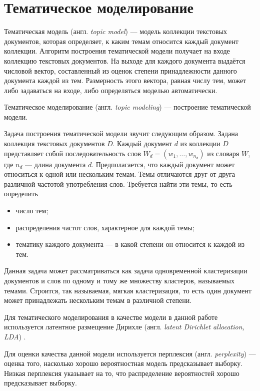 \section{Тематическое моделирование}

Тематическая модель (англ. \textit{topic model}) — модель коллекции текстовых документов, которая определяет, к каким темам относится каждый документ коллекции. Алгоритм построения тематической модели получает на входе коллекцию текстовых документов. На выходе для каждого документа выдаётся числовой вектор, составленный из оценок степени принадлежности данного документа каждой из тем. Размерность этого вектора, равная числу тем, может либо задаваться на входе, либо определяться моделью автоматически.

Тематическое моделирование (англ. \textit{topic modeling}) — построение тематической модели.

Задача построения тематической модели звучит следующим образом. Задана коллекция текстовых документов $D$. Каждый документ $d$ из коллекции $D$ представляет собой последовательность слов $W_d=(w_1,\ldots,w_{n_d})$ из словаря $W$, где $n_d$ — длина документа $d$. Предполагается, что каждый документ может относиться к одной или нескольким темам. Темы отличаются друг от друга различной частотой употребления слов. Требуется найти эти темы, то есть определить
\begin{itemize}
\item число тем;
\item распределения частот слов, характерное для каждой темы;
\item тематику каждого документа — в какой степени он относится к каждой из тем.
\end{itemize}

Данная задача может рассматриваться как задача одновременной кластеризации документов и слов по одному и тому же множеству кластеров, называемых темами. Строится, так называемая, мягкая кластеризация, то есть один документ может принадлежать нескольким темам в различной степени.

Для тематического моделирования в качестве модели в данной работе используется латентное размещение Дирихле (англ. \textit{latent Dirichlet allocation, LDA}) \cite{bib4}.

Для оценки качества данной модели используется перплексия (англ. \textit{perplexity}) --- оценка того, насколько хорошо вероятностная модель предсказывает выборку. Низкая перплексия указывает на то, что распределение вероятностей хорошо предсказывает выборку. 

